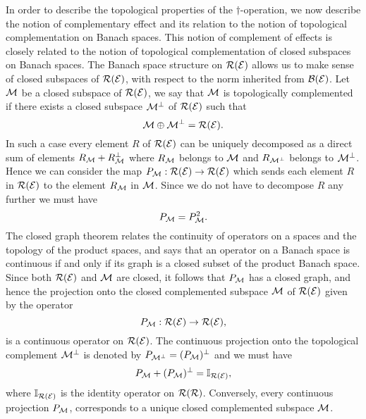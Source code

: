 \documentclass[11pt]{article}
\begin{document}
In order to describe the topological properties of the $\dagger$-operation, we now describe the notion of complementary effect and its relation to the notion of topological complementation on Banach spaces. This notion of complement of effects is closely related to the notion of topological complementation of closed subspaces on Banach spaces. The Banach space structure on $\mathcal{R}(\mathcal{E})$ allows us to make sense of closed subspaces of $\mathcal{R}(\mathcal{E})$, with respect to the norm inherited from $\mathcal{B}(\mathcal{E})$. Let $\mathcal{M}$ be a closed subspace of $\mathcal{R}(\mathcal{E})$, we say that $\mathcal{M}$ is topologically complemented if there exists a closed subspace $\mathcal{M}^\perp$ of $\mathcal{R}(\mathcal{E})$ such that
$$\mathcal{M}\oplus \mathcal{M}^\perp = \mathcal{R}(\mathcal{E}).$$
In such a case every element $R$ of $\mathcal{R}(\mathcal{E})$ can be uniquely decomposed as a direct sum of elements $R_{\mathcal{M}}+R_{\mathcal{M}}^\perp$ where $R_{\mathcal{M}}$ belongs to $\mathcal{M}$ and $R_{\mathcal{M}^\perp}$ belongs to $\mathcal{M}^\perp$. Hence we can consider the map $P_{\mathcal{M}}:\mathcal{R}(\mathcal{E})\to \mathcal{R}(\mathcal{E})$ which sends each element $R$ in $\mathcal{R}(\mathcal{E})$ to the element $R_{\mathcal{M}}$ in $\mathcal{M}$. Since we do not have to decompose $R$ any further we must have
$$P_{\mathcal{M}}=P_{\mathcal{M}}^2.$$
The closed graph theorem relates the continuity of operators on a spaces and the topology of the product spaces, and says that an operator on a Banach space is continuous if and only if its graph is a closed subset of the product Banach space. Since both $\mathcal{R}(\mathcal{E})$ and $\mathcal{M}$ are closed, it follows that $P_{\mathcal{M}}$ has a closed graph, and hence the projection onto the closed complemented subspace $\mathcal{M}$ of $\mathcal{R}(\mathcal{E})$ given by the operator
$$P_{\mathcal{M}}:\mathcal{R}(\mathcal{E})\to \mathcal{R}(\mathcal{E}),$$
is a continuous operator on $\mathcal{R}(\mathcal{E})$. The continuous projection onto the topological complement $\mathcal{M}^\perp$ is denoted by $P_{\mathcal{M}^\perp}=(P_{\mathcal{M}})^\perp$ and we must have
\[P_{\mathcal{M}}+ (P_{\mathcal{M}})^\perp=\mathbb{I}_{\mathcal{R}(\mathcal{E})},\]
where $\mathbb{I}_{\mathcal{R}(\mathcal{E})}$ is the identity operator on $\mathcal{R}(\mathcal{R})$. Conversely, every continuous projection $P_{\mathcal{M}}$, corresponds to a unique closed complemented subspace $\mathcal{M}$. 
\end{document}
